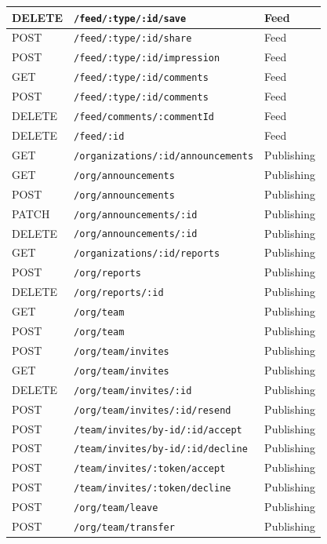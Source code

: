 \begin{longtable}{|p{}|p{}|p{}|}
DELETE & \texttt{/feed/:type/:id/save} & Feed\\\hline
POST & \texttt{/feed/:type/:id/share} & Feed\\\hline
POST & \texttt{/feed/:type/:id/impression} & Feed\\\hline
GET & \texttt{/feed/:type/:id/comments} & Feed\\\hline
POST & \texttt{/feed/:type/:id/comments} & Feed\\\hline
DELETE & \texttt{/feed/comments/:commentId} & Feed\\\hline
DELETE & \texttt{/feed/:id} & Feed\\\hline
GET & \texttt{/organizations/:id/announcements} & Publishing\\\hline
GET & \texttt{/org/announcements} & Publishing\\\hline
POST & \texttt{/org/announcements} & Publishing\\\hline
PATCH & \texttt{/org/announcements/:id} & Publishing\\\hline
DELETE & \texttt{/org/announcements/:id} & Publishing\\\hline
GET & \texttt{/organizations/:id/reports} & Publishing\\\hline
POST & \texttt{/org/reports} & Publishing\\\hline
DELETE & \texttt{/org/reports/:id} & Publishing\\\hline
GET & \texttt{/org/team} & Publishing\\\hline
POST & \texttt{/org/team} & Publishing\\\hline
POST & \texttt{/org/team/invites} & Publishing\\\hline
GET & \texttt{/org/team/invites} & Publishing\\\hline
DELETE & \texttt{/org/team/invites/:id} & Publishing\\\hline
POST & \texttt{/org/team/invites/:id/resend} & Publishing\\\hline
POST & \texttt{/team/invites/by-id/:id/accept} & Publishing\\\hline
POST & \texttt{/team/invites/by-id/:id/decline} & Publishing\\\hline
POST & \texttt{/team/invites/:token/accept} & Publishing\\\hline
POST & \texttt{/team/invites/:token/decline} & Publishing\\\hline
POST & \texttt{/org/team/leave} & Publishing\\\hline
POST & \texttt{/org/team/transfer} & Publishing\\\hline

\end{longtable}

